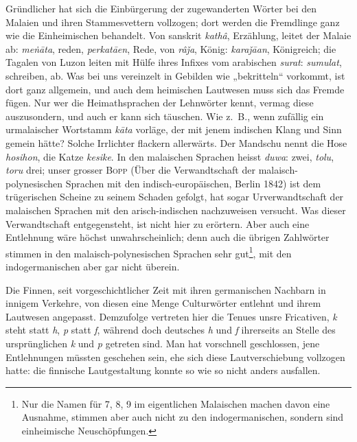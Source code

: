 {Gründlicher hat sich die Einbürgerung der zugewanderten Wörter bei den Malaien und ihren Stammesvettern vollzogen; dort werden die Fremdlinge ganz wie die Einheimischen behandelt. Von sanskrit \textit{kathâ}, Erzählung, leitet der Malaie ab: \textit{meṅāta}, reden, \textit{perkatāen}, Rede, von \textit{râǰa}, König: \textit{karaǰāan}, Königreich; die Tagalen von Luzon leiten mit Hülfe ihres Infixes  vom arabischen \textit{surat}: \textit{sumulat}, schreiben, ab. Was bei uns vereinzelt in Gebilden wie „bekritteln“ vorkommt, ist dort ganz allgemein, und auch dem heimischen Lautwesen muss sich das Fremde fügen. Nur wer die Heimathsprachen der Lehnwörter kennt, vermag diese auszusondern, und auch er kann sich täuschen. Wie z.~B., wenn zufällig ein urmalaischer Wortstamm \textit{kāta} vorläge, der mit jenem indischen Klang und Sinn gemein hätte? Solche Irrlichter flackern aller\-\label{fp.262}wärts. Der Mandschu nennt die Hose \textit{hosihon}, die Katze \textit{kesike}. In den malaischen Sprachen heisst \textit{duwa}: zwei, \textit{tolu}, \textit{toru} drei; unser grosser \textsc{Bopp} (Über die Verwandtschaft der malaisch-polynesischen Sprachen mit den indisch-europäischen, Berlin 1842) ist dem trügerischen Scheine zu seinem Schaden gefolgt, hat sogar Urverwandtschaft der malaischen Sprachen mit den arisch-indischen nachzuweisen versucht. Was dieser Verwandtschaft entgegensteht, ist nicht hier zu erörtern. Aber auch eine Entlehnung wäre höchst unwahrscheinlich; denn auch die übrigen Zahlwörter stimmen in den malaisch-polynesischen Sprachen sehr gut\footnote{Nur die Namen für 7, 8, 9 im eigentlichen Malaischen machen davon eine Ausnahme, stimmen aber auch nicht zu den indogermanischen, sondern sind einheimische Neuschöpfungen.}, mit den indogermanischen aber gar nicht überein.

Die Finnen, seit vorgeschichtlicher Zeit mit ihren germanischen Nachbarn in innigem Verkehre,   von diesen eine Menge Culturwörter entlehnt und ihrem Lautwesen angepasst. Demzufolge vertreten hier die Tenues unsre Fricativen, \textit{k} steht statt \textit{h}, \textit{p} statt \textit{f}, während doch deutsches \textit{h} und \textit{f} ihrerseits an Stelle des ursprünglichen \textit{k} und \textit{p} getreten sind. Man hat vorschnell geschlossen, jene Entlehnungen müssten geschehen sein, ehe sich diese Lautverschiebung vollzogen hatte: die finnische Lautgestaltung konnte \label{sp.267} so wie so nicht anders ausfallen. 

}
